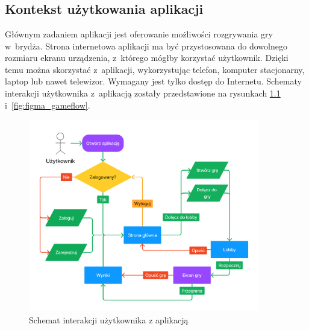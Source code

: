 \chapter{\ChapterTitleScope}
\label{sec:zakres-funkcjonalnosci}


\section{Kontekst użytkowania aplikacji}

Głównym zadaniem aplikacji jest oferowanie możliwości
rozgrywania gry w~brydża. Strona internetowa aplikacji ma być
przystosowana do dowolnego rozmiaru ekranu urządzenia, z~którego mógłby
korzystać użytkownik. Dzięki temu można skorzystać z~aplikacji, wykorzystując
telefon, komputer stacjonarny, laptop lub nawet telewizor. Wymagany
jest tylko dostęp do Internetu.
Schematy interakcji użytkownika z~aplikacją zostały przedstawione na rysunkach
\ref{fig:figma_userflow} i~\ref{fig:figma_gameflow}. \\

\begin{figure}[h!]
  \centering
  \includegraphics[width=0.9\textwidth]{img/flow-aplikacji/user_flow.png}
  \caption{Schemat interakcji użytkownika z aplikacją}
  \label{fig:figma_userflow}
\end{figure}

